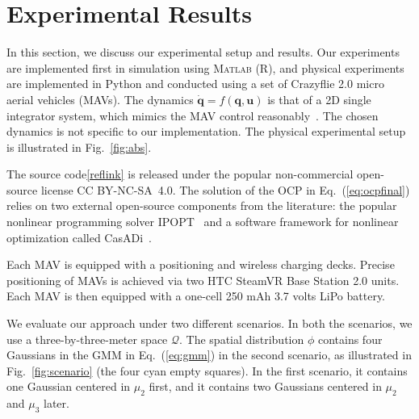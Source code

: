 \documentclass[letterpaper,10pt,conference,twoside]{IEEEtran}
\theoremstyle{definition}
\begin{document}
\section{Experimental Results}\label{sec:res}
\noindent
In this section, we discuss our experimental setup and results. Our experiments are implemented first in simulation using  \textsc{Matlab} (R), and physical experiments  are implemented in Python and conducted using a set of Crazyflie 2.0 micro aerial vehicles (MAVs). 
The dynamics $\dot{\mathbf{q}}=f(\mathbf{q},\mathbf{u})$ is that of a 2D single integrator system, which mimics the MAV control reasonably~\cite{dong2023time}. The chosen dynamics is not specific to our implementation. The physical experimental setup is illustrated in Fig.~\ref{fig:abs}.

The source code\cref{reflink} is released under the popular non-commercial open-source license CC BY-NC-SA~4.0. The solution of the OCP in Eq.~(\ref{eq:ocpfinal}) relies on two external open-source components from the literature: the popular nonlinear programming solver IPOPT~\cite{wachter2006implementation} and a software framework for nonlinear optimization called CasADi~\cite{andersson2012casadi}.

Each MAV is equipped with a positioning and wireless charging decks. Precise positioning of MAVs is achieved via two HTC SteamVR Base Station 2.0 units. Each MAV is then equipped with a one-cell 250 mAh 3.7 volts LiPo battery.%

We evaluate our approach under two different scenarios. In both the scenarios, we use a three-by-three-meter space $\mathcal{Q}$. The spatial distribution $\phi$ contains four Gaussians in the GMM in Eq.~(\ref{eq:gmm}) in the second scenario, as illustrated in Fig.~\ref{fig:scenario} (the four cyan empty squares). In the first scenario, it contains one Gaussian centered in $\mu_2$ first, and it contains two Gaussians centered in $\mu_2$ and $\mu_3$ later.
\end{document}
